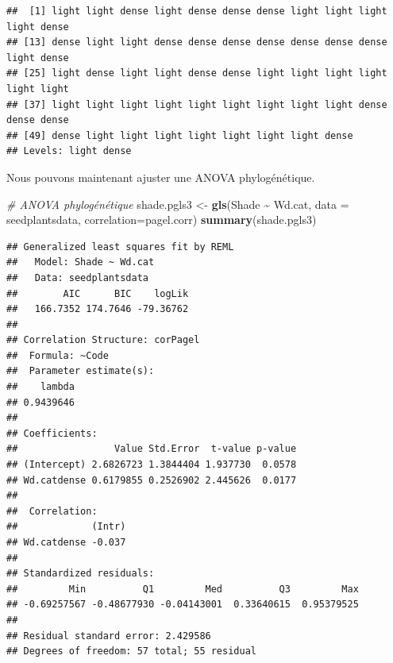 \documentclass[
]{book}
\newenvironment{Shaded}{\begin{snugshade}}{\end{snugshade}}
\newcommand{\AttributeTok}[1]{\textcolor[rgb]{0.13,0.29,0.53}{#1}}
\newcommand{\CommentTok}[1]{\textcolor[rgb]{0.56,0.35,0.01}{\textit{#1}}}
\newcommand{\DecValTok}[1]{\textcolor[rgb]{0.00,0.00,0.81}{#1}}
\newcommand{\FunctionTok}[1]{\textcolor[rgb]{0.13,0.29,0.53}{\textbf{#1}}}
\newcommand{\NormalTok}[1]{#1}
\newcommand{\OtherTok}[1]{\textcolor[rgb]{0.56,0.35,0.01}{#1}}
\newcommand{\SpecialCharTok}[1]{\textcolor[rgb]{0.81,0.36,0.00}{\textbf{#1}}}
\newcommand{\StringTok}[1]{\textcolor[rgb]{0.31,0.60,0.02}{#1}}
\begin{document}
\begin{Shaded}
\end{Shaded}

\begin{verbatim}
##  [1] light light dense light dense dense dense light light light light dense
## [13] dense light light dense dense dense dense dense dense dense light dense
## [25] light dense light light dense dense light light light light light light
## [37] light light light light light light light light light dense dense dense
## [49] dense light light light light light light light dense
## Levels: light dense
\end{verbatim}

Nous pouvons maintenant ajuster une ANOVA phylogénétique.

\begin{Shaded}
\begin{Highlighting}[]
\CommentTok{\# ANOVA phylogénétique}
\NormalTok{shade.pgls3 }\OtherTok{\textless{}{-}} \FunctionTok{gls}\NormalTok{(Shade }\SpecialCharTok{\textasciitilde{}}\NormalTok{ Wd.cat, }\AttributeTok{data =}\NormalTok{ seedplantsdata, }\AttributeTok{correlation=}\NormalTok{pagel.corr)}
\FunctionTok{summary}\NormalTok{(shade.pgls3)}
\end{Highlighting}
\end{Shaded}

\begin{verbatim}
## Generalized least squares fit by REML
##   Model: Shade ~ Wd.cat 
##   Data: seedplantsdata 
##        AIC      BIC    logLik
##   166.7352 174.7646 -79.36762
## 
## Correlation Structure: corPagel
##  Formula: ~Code 
##  Parameter estimate(s):
##    lambda 
## 0.9439646 
## 
## Coefficients:
##                 Value Std.Error  t-value p-value
## (Intercept) 2.6826723 1.3844404 1.937730  0.0578
## Wd.catdense 0.6179855 0.2526902 2.445626  0.0177
## 
##  Correlation: 
##             (Intr)
## Wd.catdense -0.037
## 
## Standardized residuals:
##         Min          Q1         Med          Q3         Max 
## -0.69257567 -0.48677930 -0.04143001  0.33640615  0.95379525 
## 
## Residual standard error: 2.429586 
## Degrees of freedom: 57 total; 55 residual
\end{verbatim}
\end{document}
